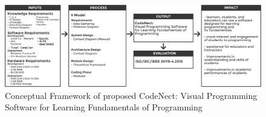 \begin{figure}[H]
	\centering
	\captionsetup{justification=centering}
	\captionsetup[figure]{list=yes}
	\includegraphics[width=\linewidth]{figures/conceptual_framework.png}
	\caption[Conceptual Framework]{Conceptual Framework of proposed CodeNect: Visual Programming Software for Learning Fundamentals of Programming}
	\label{fig:conceptual_framework}
\end{figure}
